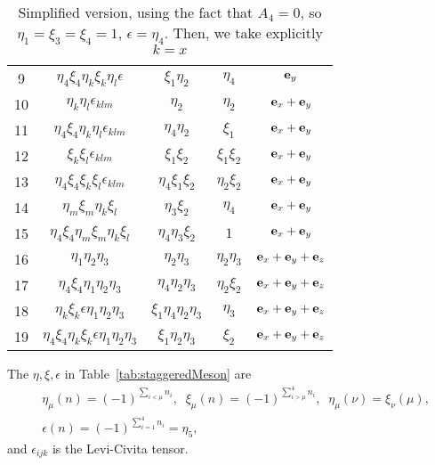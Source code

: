 \begin{table}
\begin{center}
\begin{tabular}{c|c|c|c|c}
9  & $\eta_4\xi_4\eta_k\xi_k\eta_l\epsilon$      & $\xi_1\eta_2$                   & $\eta_4$       & ${\bf e}_y$                     \\
10 & $\eta _k\eta _l \epsilon _{klm}$            & $\eta _2 $                      & $\eta _2$      & ${\bf e}_x+{\bf e}_y$           \\
11 & $\eta_4\xi_4\eta _k\eta _l \epsilon _{klm}$ & $\eta_4\eta _2$                 & $\xi _1$       & ${\bf e}_x+{\bf e}_y$           \\
12 & $\xi _k\xi _l \epsilon _{klm}$              & $\xi _1\xi _2$                  & $\xi_1\xi_2$   & ${\bf e}_x+{\bf e}_y$           \\
13 & $\eta_4\xi_4\xi _k\xi _l \epsilon _{klm}$   & $\eta_4\xi _1\xi _2$            & $\eta_2\xi_2$  & ${\bf e}_x+{\bf e}_y$           \\
14 & $\eta _m\xi _m\eta _k\xi _l$                & $\eta _3\xi _2$                 & $\eta_4$       & ${\bf e}_x+{\bf e}_y$           \\
15 & $\eta_4\xi_4\eta _m\xi _m\eta _k\xi _l$     & $\eta_4\eta _3\xi _2$           & $1$            & ${\bf e}_x+{\bf e}_y$           \\
16 & $\eta _1\eta _2\eta _3$                     & $\eta _2\eta _3$                & $\eta_2\eta_3$ & ${\bf e}_x+{\bf e}_y+{\bf e}_z$ \\
17 & $\eta_4\xi_4\eta _1\eta _2\eta _3$          & $\eta_4\eta _2\eta _3$          & $\eta_2\xi_2$  & ${\bf e}_x+{\bf e}_y+{\bf e}_z$ \\
18 & $\eta_k\xi_k\epsilon\eta _1\eta _2\eta _3$  & $\xi_1\eta_4\eta _2\eta _3$     & $\eta _3$      & ${\bf e}_x+{\bf e}_y+{\bf e}_z$ \\
19 & $\eta_4\xi_4\eta_k\xi_k\epsilon\eta _1\eta _2\eta _3$ & $\xi_1\eta _2\eta _3$ & $\xi _2$       & ${\bf e}_x+{\bf e}_y+{\bf e}_z$ \\
\hline
\end{tabular}
\end{center}
\caption{\label{tab:staggeredMeson2}Simplified version, using the fact that $A_4=0$, so $\eta _1=\xi _3=\xi _4=1$, $\epsilon = \eta _4$. Then, we take explicitly $k=x$}
\end{table}

The $\eta,\xi,\epsilon$ in Table~\ref{tab:staggeredMeson} are
\begin{equation}
\begin{split}
&\eta_{\mu}(n)=(-1)^{\sum _{i<\mu} n_i},\;\;\xi _{\mu}(n)=(-1)^{\sum _{i> \mu}^4 n_i},\;\;\eta _{\mu}(\nu)=\xi _{\nu}(\mu),\\
&\epsilon (n) = (-1)^{\sum _{i=1}^4 n_i}=\eta _5,
\end{split}
\end{equation}
and $\epsilon _{ijk}$ is the Levi-Civita tensor.

